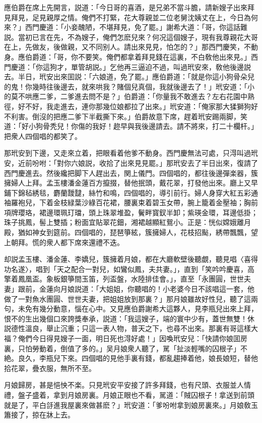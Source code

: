 應伯爵在席上先開言，説道：「今日哥的喜酒，是兄弟不當斗膽，請新嫂子出來拜見拜見，足見親厚之情。俺們不打緊，花大尊親並二位老舅沈姨丈在上，今日為何來？」西門慶道：「小妾醜陋，不堪拜見，免了罷。」謝希大道：「哥，你這話難説。當初已言在先，不為嫂子，俺們怎麽兒來？何况這個嫂子，現有我尊親花大哥在上，先做友，後做親，又不同别人。請出來見見，怕怎的？」那西門慶笑，不動身。應伯爵道：「哥，你不要笑。俺們都拿着拜見錢在這裏，不白敎他出來見。」西門慶道：「你這狗才，單管胡説。」乞他再三逼迫不過，叫過玳安來，敎他後邊説去。半日，玳安出來囬説：「六娘道，免了罷。」應伯爵道：「就是你這小狗骨朵兒的鬼！你幾時往後邊去，就來哄我？賭個兒真個，我就後邊去了！」玳安道：「小的莫不哄應二爹，二爹進去問不是？」伯爵道：「你量我不敢進去？左右花園中熟徑，好不好，我走進去，連你那幾位娘都拉了出來。」玳安道：「俺家那大猱獅狗好不利害。倒沒的把應二爹下半截撕下來。」伯爵故意下席，趕着玳安踢兩脚，笑道：「好小狗骨秃兒！你傷的我好！趂早與我後邊請去。請不將來，打二十欄杆。」把衆人四個唱的都笑了。

那玳安到下邊，又走來立着，把眼看着他爹不動身。西門慶無法可處，只淂叫過玳安，近前吩咐：「對你六娘説，收拾了出來見見罷。」那玳安去了半日出來，復請了西門慶進去。然後纔把脚下人趕出去，関上儀門。四個唱的，都往後邊彈楽器，簇擁婦人上拜。孟玉樓潘金蓮百方攛掇，替他抿頭，戴花翠，打發他出來。廳上又早鋪下錦毡綉毯，麝蘭靉靆，絲竹和鳴，四個唱的，導引前行。婦人身穿大紅五彩通袖羅袍兒，下着金枝緑葉沙綠百花裙，腰裏束着碧玉女帶，腕上籠着金壓袖；胸前項牌瓔珞，裙邊環珮玎璫，頭上珠翠堆盈，鬢畔寳釵半卸；紫瑛金環，耳邊低掛；珠子挑鳳，髻上雙插；粉面宜貼翠花鈿，湘裙越顯紅鴛小。正是：恍似嫦娥離月殿，猶如神女到筵前。四個唱的，琵琶箏絃，簇擁婦人，花枝招颭，綉帶飄飄，望上朝拜。慌的衆人都下席來還禮不迭。

却説孟玉樓、潘金蓮、李嬌兒，簇擁着月娘，都在大廳軟壁後聽覷，聽見唱〈喜得功名遂〉，唱到「天之配合一對兒，如鸞似鳳，夫共妻。」，直到「笑吟吟慶喜，高擎着鳳凰盃。象板銀箏間玉笛，列盃盤，水陸排佳會。」，直至「永團圓，世世夫妻」跟前，金蓮向月娘説道：「大姐姐，你聽唱的！小老婆今日不該唱這一套，他做了一對魚水團圓、世世夫妻，把姐姐放到那裏？」那月娘雖故好性兒，聽了這兩句，未免有幾分動意，惱在心中。又見應伯爵謝希大這夥人，見李瓶兒出來上拜，恨不的生出幾個口來誇獎奉承，説道：「我這嫂子，端的寰中少有，蓋世無雙！休説德性溫良，舉止沉重；只這一表人物，普天之下，也尋不出來。那裏有哥這樣大福？俺們今日得見嫂子一面，明日死也淂好處！」因喚玳安兒：「快請你娘囬房裏，只怕勞動着，倒值了多的。」吴月娘衆人聽了，駡「扯淡輕嘴的囚根子」不絶。良久，李瓶兒下來。四個唱的見他手裏有錢，都亂趨捧着他，娘長娘短，替他拾花翠，疊衣服，無所不至。

月娘歸房，甚是悒怏不楽。只見玳安平安接了許多拜錢，也有尺頭、衣服並人情禮，盤子盛着，拿到月娘房裏。月娘正眼也不看，駡道：「賊囚根子！拿送到前頭就是了，平白㧱進我屋裏來做甚麽？」玳安道：「爹吩咐拿到娘房裏來。」月娘敎玉簫接了，掠在牀上去。

